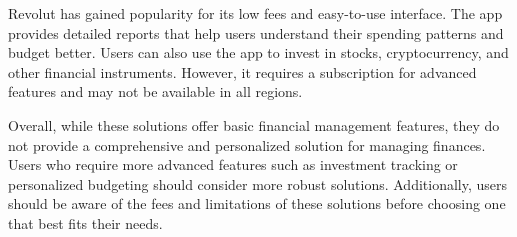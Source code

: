 Revolut has gained popularity for its low fees and easy-to-use interface. The app provides detailed reports that help users understand their spending patterns and budget better. Users can also use the app to invest in stocks, cryptocurrency, and other financial instruments. However, it requires a subscription for advanced features and may not be available in all regions.

Overall, while these solutions offer basic financial management features, they do not provide a comprehensive and personalized solution for managing finances. Users who require more advanced features such as investment tracking or personalized budgeting should consider more robust solutions. Additionally, users should be aware of the fees and limitations of these solutions before choosing one that best fits their needs.
